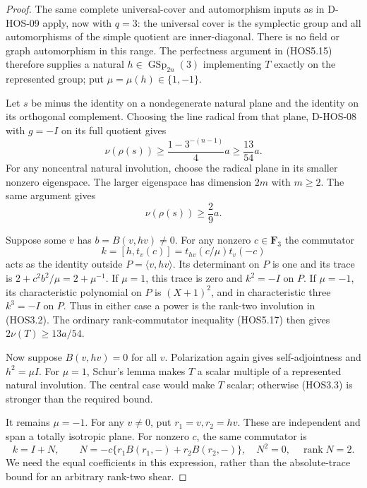 \begin{proof}
The same complete universal-cover and automorphism inputs as in
D-HOS-09 apply, now with $q=3$: the universal cover is the
symplectic group and all automorphisms of the simple quotient are
inner-diagonal. There is no field or graph automorphism in this
range. The perfectness argument in (HOS5.15) therefore supplies a
natural $h\in\operatorname{GSp}_{2n}(3)$ implementing $T$ exactly
on the represented group; put $\mu=\mu(h)\in\{1,-1\}$.

Let $s$ be minus the identity on a nondegenerate natural plane and
the identity on its orthogonal complement. Choosing the line
radical from that plane, D-HOS-08 with $g=-I$ on its full
quotient gives
\[
               \nu(\rho(s))\ge\frac{1-3^{-(n-1)}}4a
                                      \ge\frac{13}{54}a.
                                                               \tag{HOS3.2}
\]
For any noncentral natural involution, choose the radical plane
in its smaller nonzero eigenspace. The larger eigenspace has
dimension $2m$ with $m\ge2$. The same argument gives
\[
                            \nu(\rho(s))\ge\frac29a.         \tag{HOS3.3}
\]

Suppose some $v$ has $b=B(v,hv)\ne0$. For any nonzero
$c\in\mathbf F_3$ the commutator
\[
 k=[h,t_v(c)]=t_{hv}(c/\mu)t_v(-c)
\]
acts as the identity outside $P=\langle v,hv\rangle$. Its
determinant on $P$ is one and its trace is
$2+c^2b^2/\mu=2+\mu^{-1}$. If $\mu=1$, this trace is zero
and $k^2=-I$ on $P$. If $\mu=-1$, its characteristic polynomial
on $P$ is $(X+1)^2$, and in characteristic three $k^3=-I$ on
$P$. Thus in either case a power is the rank-two involution
in (HOS3.2). The ordinary rank-commutator inequality (HOS5.17)
then gives $2\nu(T)\ge13a/54$.

Now suppose $B(v,hv)=0$ for all $v$. Polarization again gives
self-adjointness and $h^2=\mu I$. For $\mu=1$, Schur's lemma
makes $T$ a scalar multiple of a represented natural involution.
The central case would make $T$ scalar; otherwise (HOS3.3)
is stronger than the required bound.

It remains $\mu=-1$. For any $v\ne0$, put $r_1=v,r_2=hv$.
These are independent and span a totally isotropic plane. For
nonzero $c$, the same commutator is
\[
 k=I+N,\qquad
 N=-c\{r_1B(r_1,-)+r_2B(r_2,-)\},\quad
                 N^2=0,\quad\operatorname{rank}N=2.         \tag{HOS3.4}
\]
We need the equal coefficients in this expression, rather than
the absolute-trace bound for an arbitrary rank-two shear.


\end{proof}
